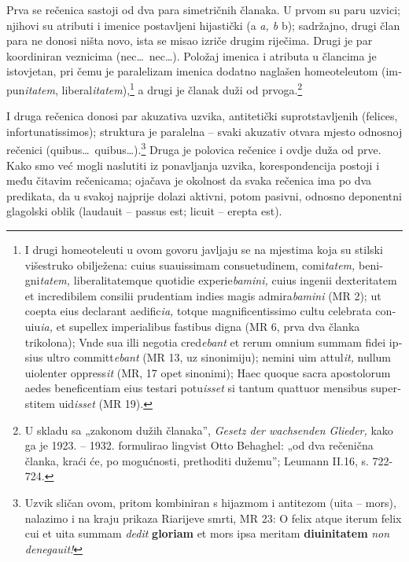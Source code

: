 \documentclass[a5paper,twoside]{article}
\begin{document}
Prva se rečenica sastoji od dva para simetričnih članaka. U prvom su paru uzvici; njihovi su atributi i imenice postavljeni hijastički (a \textit{a, b} b); sadržajno, drugi član para ne donosi ništa novo, ista se misao izriče drugim riječima. Drugi je par koordiniran veznicima \textlatin{(nec\dots\ nec\dots).} Položaj imenica i atributa u člancima je istovjetan, pri čemu je paralelizam imenica dodatno naglašen homeoteleutom \textlatin{(impun\textit{itatem}, liberal\textit{itatem}),}\footnote{I drugi homeoteleuti u ovom govoru javljaju se na mjestima koja su stilski višestruko obilježena: \textlatin{cuius suauissimam consuetudinem, comi\textit{tatem,} benigni\textit{tatem,} liberalitatemque quotidie experie\textit{bamini,} cuius ingenii dexteritatem et incredibilem consilii prudentiam indies magis admira\textit{bamini}} (MR 2); \textlatin{ut coepta eius declarant aedific\textit{ia,} totque magnificentissimo cultu celebrata conuiu\textit{ia,} et supellex imperialibus fastibus digna} (MR 6, prva dva članka trikolona); \textlatin{Vnde sua illi negotia cred\textit{ebant} et rerum omnium summam fidei ipsius ultro committ\textit{ebant}} (MR 13, uz sinonimiju); \textlatin{nemini uim attul\textit{it,} nullum uiolenter oppress\textit{it}} (MR, 17 opet sinonimi); \textlatin{Haec quoque sacra apostolorum aedes beneficentiam eius testari potu\textit{isset} si tantum quattuor mensibus superstitem uid\textit{isset}} (MR 19).} a drugi je članak duži od prvoga.\footnote{U skladu sa „zakonom dužih članaka”, \textit{Gesetz der wachsenden Glieder,} kako ga je 1923. – 1932. formulirao lingvist Otto Behaghel: „od dva rečenična članka, kraći će, po mogućnosti, prethoditi dužemu”; Leumann II.16, s. 722-724.}

I druga rečenica donosi par akuzativa uzvika, antitetički suprotstavljenih \textlatin{(felices, infortunatissimos);} struktura je paralelna – svaki akuzativ otvara mjesto odnosnoj rečenici \textlatin{(quibus\dots\ quibus\dots).}\footnote{Uzvik sličan ovom, pritom kombiniran s hijazmom i antitezom \textlatin{(uita – mors)}, nalazimo i na kraju prikaza Riarijeve smrti, MR 23: \textlatin{O felix atque iterum felix cui et uita summam \textit{dedit} \textbf{gloriam} et mors ipsa meritam \textbf{diuinitatem} \textit{non denegauit!}}} Druga je polovica rečenice i ovdje duža od prve. Kako smo već mogli naslutiti iz ponavljanja uzvika, korespondencija postoji i među čitavim rečenicama; ojačava je okolnost da svaka rečenica ima po dva predikata, da u svakoj najprije dolazi aktivni, potom pasivni, odnosno deponentni glagolski oblik \textlatin{(laudauit – passus est; licuit – erepta est).}
\end{document}
